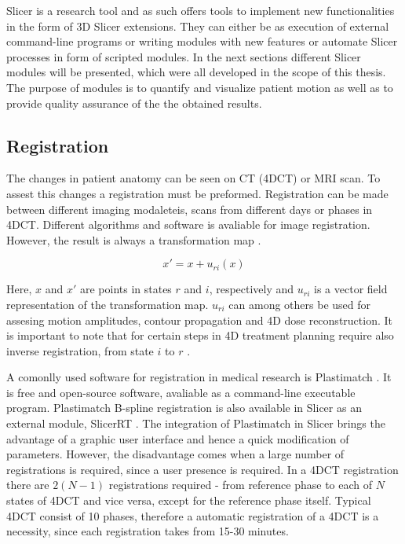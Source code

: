 \documentclass[type=dr, dr=rernat, accentcolor=tud7b,colorbacktitle, bigchapter, openright, twoside, 12pt ]{tudthesis}
\begin{document}
Slicer is a research tool and as such offers tools to implement new functionalities in the form of 3D Slicer extensions. They can either be as execution of external command-line programs or writing modules with new features or automate Slicer processes in form of scripted modules. 
In the next sections different Slicer modules will be presented, which were all developed in the scope of this thesis. The purpose of modules is to quantify and visualize patient motion as well as to provide quality assurance of the the obtained results.




\subsection{Registration}
\label{Registration}

The changes in patient anatomy can be seen on CT (4DCT) or MRI scan. To assest this changes a registration must be preformed. Registration can be made between different imaging modaleteis, scans from different days or phases in 4DCT. Different algorithms and software is avaliable
for image registration. However, the result is always a transformation map \cite{Richter2012}. 

\begin{equation}
\label{df}
x' = x + u_{ri}(x)
\end{equation} 

Here, $x$ and $x'$ are points in states $r$ and $i$, respectively and $u_{ri}$ is a vector field representation of the transformation map. $u_{ri}$ can among others be used for assesing motion amplitudes, contour propagation and 4D dose reconstruction. It is important to note
that for certain steps in 4D treatment planning require also inverse registration, from state $i$ to $r$ \cite{Richter2012}.

A comonlly used software for registration in medical research is Plastimatch \cite{Shackleford2010}. It is free and open-source software, avaliable as a command-line executable program. Plastimatch B-spline registration is also available in Slicer as an external module, SlicerRT \cite{Pinter2012}.  
The integration of Plastimatch in Slicer brings the advantage of a graphic user interface and hence a quick modification of parameters. However, the disadvantage comes when a large number of registrations is required, since a user presence is required. In a 4DCT registration
there are $2(N-1)$ registrations required - from reference phase to each of $N$ states of 4DCT and vice versa, except for the reference phase itself. Typical 4DCT consist of 10 phases, therefore a automatic registration of a 4DCT is a necessity, since each registration takes from 15-30 minutes.
\end{document}
